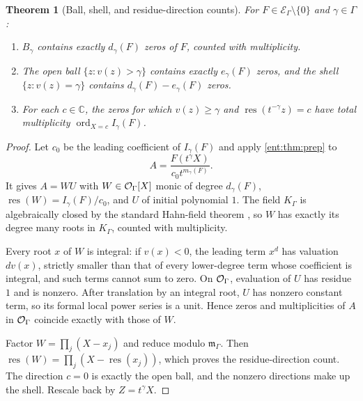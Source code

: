 \documentclass[11pt]{article}
\newtheorem{theorem}{Theorem}[section]
\theoremstyle{plain}
\theoremstyle{plain}
\theoremstyle{plain}
\theoremstyle{definition}
\theoremstyle{definition}
\theoremstyle{definition}
\theoremstyle{definition}
\theoremstyle{remark}
\newcommand{\C}{\mathbb C}\newcommand{\R}{\mathbb R}
\newcommand{\K}{K_\Gamma}\newcommand{\KD}{K_\Delta}
\newcommand{\E}{\mathcal E_\Gamma}
\newcommand{\mm}{\mathfrak m_\Gamma}
\DeclareMathOperator{\ord}{ord}\DeclareMathOperator{\cf}{cf}
\newcommand{\res}{\operatorname{res}}
\begin{document}
\begin{theorem}[Ball, shell, and residue-direction counts]
\label{ent:thm:roots}
For $F\in\E\setminus\{0\}$ and $\gamma\in\Gamma$:
\begin{enumerate}[label=\textnormal{(\alph*)},leftmargin=2em]
\item $B_\gamma$ contains exactly $d_\gamma(F)$ zeros of $F$, counted with
multiplicity.
\item The open ball $\{z:v(z)>\gamma\}$ contains exactly $e_\gamma(F)$ zeros,
and the shell $\{z:v(z)=\gamma\}$ contains $d_\gamma(F)-e_\gamma(F)$ zeros.
\item For each $c\in\C$, the zeros for which $v(z)\ge\gamma$ and
$\res(t^{-\gamma}z)=c$ have total multiplicity $\ord_{X=c}I_\gamma(F)$.
\end{enumerate}
\end{theorem}
\begin{proof}
Let $c_0$ be the leading coefficient of $I_\gamma(F)$ and apply
\cref{ent:thm:prep} to
\[
 A=\frac{F(t^\gamma X)}{c_0t^{m_\gamma(F)}}.
\]
It gives $A=WU$ with $W\in\mathcal O_\Gamma[X]$ monic of degree $d_\gamma(F)$,
$\res(W)=I_\gamma(F)/c_0$, and $U$ of initial polynomial $1$. The field $\K$
is algebraically closed by the standard Hahn-field theorem
\cite[Corollary~4]{Poonen}, so $W$ has exactly its degree many roots in $\K$,
counted with multiplicity.

Every root $x$ of $W$ is integral: if $v(x)<0$, the leading term $x^d$ has
valuation $dv(x)$, strictly smaller than that of every lower-degree term
whose coefficient is integral, and such terms cannot sum to zero. On $\mathcal O_\Gamma$,
evaluation of $U$ has residue $1$ and is nonzero. After translation by an
integral root, $U$ has nonzero constant term, so its formal local power
series is a unit. Hence zeros and multiplicities of $A$ in $\mathcal O_\Gamma$ coincide
exactly with those of $W$.

Factor $W=\prod_j(X-x_j)$ and reduce modulo $\mm$. Then
$\res(W)=\prod_j(X-\res(x_j))$, which proves the residue-direction count.
The direction $c=0$ is exactly the open ball, and the nonzero directions make
up the shell. Rescale back by $Z=t^\gamma X$.
\end{proof}
\end{document}
